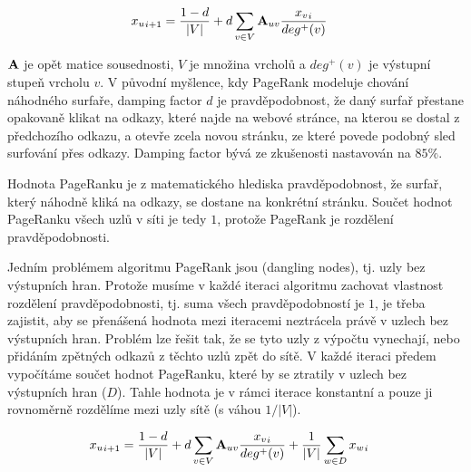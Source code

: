 \documentclass{bakalarka}
\begin{document}
\begin{align}
{x_u}_{i + 1} &= \frac{1 - d}{|V|} + d \displaystyle\sum_{v \in V} {\bf A}_{uv}
\frac{{x_v}_{i}}{deg^+ (v)}
\end{align}

${\bf A}$ je opět matice sousednosti, $V$ je množina vrcholů a $deg^+(v)$ je
výstupní stupeň vrcholu $v$.  V původní myšlence, kdy PageRank modeluje chování
náhodného surfaře, damping factor $d$ je pravděpodobnost, že daný surfař
přestane opakovaně klikat na odkazy, které najde na webové stránce, na kterou
se dostal z předchozího odkazu, a otevře zcela novou stránku, ze které povede
podobný sled surfování přes odkazy.  Damping factor bývá ze zkušenosti
nastavován na $85\%$.

Hodnota PageRanku je z matematického hlediska pravděpodobnost, že surfař, který
náhodně kliká na odkazy, se dostane na konkrétní stránku. Součet hodnot
PageRanku všech uzlů v síti je tedy $1$, protože PageRank je rozdělení
pravděpodobnosti.

Jedním problémem algoritmu PageRank jsou  (dangling nodes), tj.
uzly bez výstupních hran. Protože musíme v každé iteraci algoritmu zachovat
vlastnost rozdělení pravděpodobnosti, tj. suma všech pravděpodobností je $1$,
je třeba zajistit, aby se přenášená hodnota mezi iteracemi neztrácela právě v
uzlech bez výstupních hran. Problém lze řešit tak, že se tyto uzly z výpočtu
vynechají, nebo přidáním zpětných odkazů z těchto uzlů zpět do sítě.  V každé
iteraci předem vypočítáme součet hodnot PageRanku, které by se ztratily v
uzlech bez výstupních hran ($D$). Tahle hodnota je v rámci iterace konstantní a
pouze ji rovnoměrně rozdělíme mezi uzly sítě (s váhou $1/|V|$).

\begin{align}
{x_u}_{i + 1} &= \frac{1 - d}{|V|} + d \displaystyle\sum_{v \in V} {\bf A}_{uv} \frac{{x_v}_i}{deg^+ (v)} + \frac{1}{|V|} \displaystyle\sum_{w \in D} {x_w}_i
\end{align}
\end{document}

